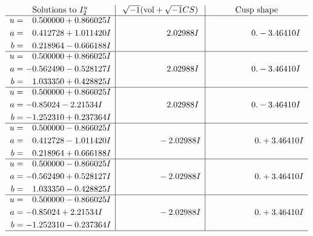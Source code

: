 \documentclass[1p]{elsarticle_modified}
\theoremstyle{definition}
\newcommand{\I}{\sqrt{-1}}
\begin{document}
$$\begin{array}{c|c|c}  
\text{Solutions to }I^u_{2}& \I (\text{vol} + \sqrt{-1}CS) & \text{Cusp shape}\\
 \hline 
\begin{aligned}
u &= \phantom{-}0.500000 + 0.866025 I \\
a &= \phantom{-}0.412728 + 1.011420 I \\
b &= \phantom{-}0.218964 - 0.666188 I\end{aligned}
 & \phantom{-0.000000 -}2.02988 I & \phantom{-0.000000 } 0. - 3.46410 I \\ \hline\begin{aligned}
u &= \phantom{-}0.500000 + 0.866025 I \\
a &= -0.562490 - 0.528127 I \\
b &= \phantom{-}1.033350 + 0.428825 I\end{aligned}
 & \phantom{-0.000000 -}2.02988 I & \phantom{-0.000000 } 0. - 3.46410 I \\ \hline\begin{aligned}
u &= \phantom{-}0.500000 + 0.866025 I \\
a &= -0.85024 - 2.21534 I \\
b &= -1.252310 + 0.237364 I\end{aligned}
 & \phantom{-0.000000 -}2.02988 I & \phantom{-0.000000 } 0. - 3.46410 I \\ \hline\begin{aligned}
u &= \phantom{-}0.500000 - 0.866025 I \\
a &= \phantom{-}0.412728 - 1.011420 I \\
b &= \phantom{-}0.218964 + 0.666188 I\end{aligned}
 & \phantom{-0.000000 } -2.02988 I & \phantom{-0.000000 -}0. + 3.46410 I \\ \hline\begin{aligned}
u &= \phantom{-}0.500000 - 0.866025 I \\
a &= -0.562490 + 0.528127 I \\
b &= \phantom{-}1.033350 - 0.428825 I\end{aligned}
 & \phantom{-0.000000 } -2.02988 I & \phantom{-0.000000 -}0. + 3.46410 I \\ \hline\begin{aligned}
u &= \phantom{-}0.500000 - 0.866025 I \\
a &= -0.85024 + 2.21534 I \\
b &= -1.252310 - 0.237364 I\end{aligned}
 & \phantom{-0.000000 } -2.02988 I & \phantom{-0.000000 -}0. + 3.46410 I\\
 \hline 
 \end{array}$$\newpage\newpage\renewcommand{\arraystretch}{1}
\end{document}
